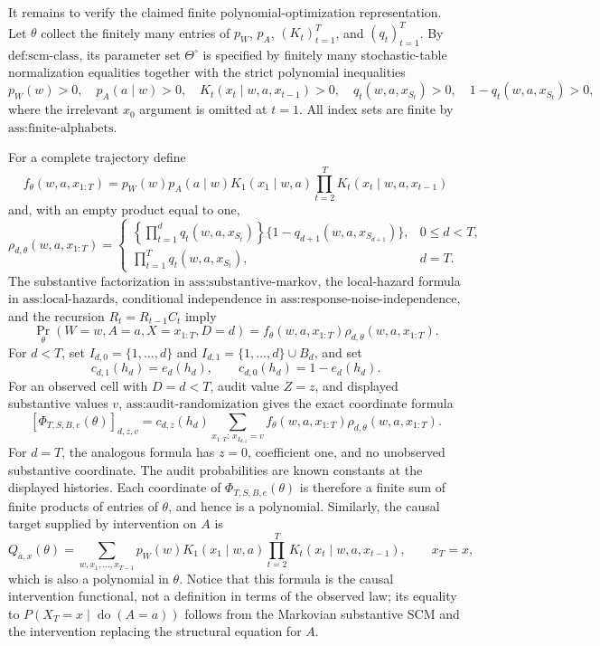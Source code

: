 It remains to verify the claimed finite polynomial-optimization representation.  Let \(\theta\) collect the finitely many entries of \(p_W\), \(p_A\), \((K_t)_{t=1}^T\), and \((q_t)_{t=1}^T\).  By \(\text{def:scm-class}\), its parameter set \(\Theta^\circ\) is specified by finitely many stochastic-table normalization equalities together with the strict polynomial inequalities
\[
p_W(w)>0,\quad p_A(a\mid w)>0,\quad K_t(x_t\mid w,a,x_{t-1})>0,
\quad q_t(w,a,x_{S_t})>0,
\quad 1-q_t(w,a,x_{S_t})>0,
\]
where the irrelevant \(x_0\) argument is omitted at \(t=1\).  All index sets are finite by \(\text{ass:finite-alphabets}\).

For a complete trajectory define
\[
f_\theta(w,a,x_{1:T})
=p_W(w)p_A(a\mid w)K_1(x_1\mid w,a)
 \prod_{t=2}^T K_t(x_t\mid w,a,x_{t-1})
\]
and, with an empty product equal to one,
\[
\rho_{d,\theta}(w,a,x_{1:T})=
\begin{cases}
\displaystyle
\left\{\prod_{t=1}^{d}q_t(w,a,x_{S_t})\right\}
\{1-q_{d+1}(w,a,x_{S_{d+1}})\},&0\leq d<T,\\[6pt]
\displaystyle\prod_{t=1}^{T}q_t(w,a,x_{S_t}),&d=T.
\end{cases}
\]
The substantive factorization in \(\text{ass:substantive-markov}\), the local-hazard formula in \(\text{ass:local-hazards}\), conditional independence in \(\text{ass:response-noise-independence}\), and the recursion \(R_t=R_{t-1}C_t\) imply
\[
\Pr_\theta(W=w,A=a,X=x_{1:T},D=d)
=f_\theta(w,a,x_{1:T})\rho_{d,\theta}(w,a,x_{1:T}).
\]
For \(d<T\), set \(I_{d,0}=\{1,\ldots,d\}\) and \(I_{d,1}=\{1,\ldots,d\}\cup B_d\), and set
\[
c_{d,1}(h_d)=e_d(h_d),
\qquad c_{d,0}(h_d)=1-e_d(h_d).
\]
For an observed cell with \(D=d<T\), audit value \(Z=z\), and displayed substantive values \(v\), \(\text{ass:audit-randomization}\) gives the exact coordinate formula
\[
[\Phi_{T,S,B,e}(\theta)]_{d,z,v}
=c_{d,z}(h_d)
\sum_{x_{1:T}:\,x_{I_{d,z}}=v}
f_\theta(w,a,x_{1:T})\rho_{d,\theta}(w,a,x_{1:T}).
\]
For \(d=T\), the analogous formula has \(z=0\), coefficient one, and no unobserved substantive coordinate.  The audit probabilities are known constants at the displayed histories.  Each coordinate of \(\Phi_{T,S,B,e}(\theta)\) is therefore a finite sum of finite products of entries of \(\theta\), and hence is a polynomial.  Similarly, the causal target supplied by intervention on \(A\) is
\[
Q_{a,x}(\theta)=
\sum_{w,x_1,\ldots,x_{T-1}}
p_W(w)K_1(x_1\mid w,a)
\prod_{t=2}^T K_t(x_t\mid w,a,x_{t-1}),
\qquad x_T=x,
\]
which is also a polynomial in \(\theta\).  Notice that this formula is the causal intervention functional, not a definition in terms of the observed law; its equality to \(P(X_T=x\mid\operatorname{do}(A=a))\) follows from the Markovian substantive SCM and the intervention replacing the structural equation for \(A\).

